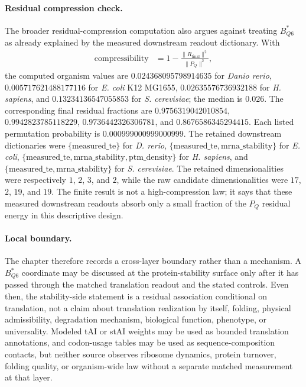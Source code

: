 \paragraph{Residual compression check.}
The broader residual-compression computation also argues against treating $B^{\ast}_{Q6}$ as already explained by the measured downstream readout dictionary. With
$$
\begin{aligned}
\mathrm{compressibility} &= 1-\frac{\lVert R_{\mathrm{final}}\rVert^2}{\lVert P_Q\rVert^2},
\end{aligned}
$$
the computed organism values are $0.024368095798914635$ for \emph{Danio rerio}, $0.005717621488177116$ for \emph{E. coli} K12 MG1655, $0.02635576736932188$ for \emph{H. sapiens}, and $0.13234136547055853$ for \emph{S. cerevisiae}; the median is $0.026$. The corresponding final residual fractions are $0.9756319042010854$, $0.9942823785118229$, $0.9736442326306781$, and $0.8676586345294415$. Each listed permutation probability is $0.000999000999000999$. The retained downstream dictionaries were $\{\mathrm{measured\_te}\}$ for \emph{D. rerio}, $\{\mathrm{measured\_te},\mathrm{mrna\_stability}\}$ for \emph{E. coli}, $\{\mathrm{measured\_te},\mathrm{mrna\_stability},\mathrm{ptm\_density}\}$ for \emph{H. sapiens}, and $\{\mathrm{measured\_te},\mathrm{mrna\_stability}\}$ for \emph{S. cerevisiae}. The retained dimensionalities were respectively $1$, $2$, $3$, and $2$, while the raw candidate dimensionalities were $17$, $2$, $19$, and $19$. The finite result is not a high-compression law; it says that these measured downstream readouts absorb only a small fraction of the $P_Q$ residual energy in this descriptive design.

\paragraph{Local boundary.}
The chapter therefore records a cross-layer boundary rather than a mechanism. A $B^{\ast}_{Q6}$ coordinate may be discussed at the protein-stability surface only after it has passed through the matched translation readout and the stated controls. Even then, the stability-side statement is a residual association conditional on translation, not a claim about translation realization by itself, folding, physical admissibility, degradation mechanism, biological function, phenotype, or universality. Modeled tAI or stAI weights may be used as bounded translation annotations, and codon-usage tables may be used as sequence-composition contacts, but neither source observes ribosome dynamics, protein turnover, folding quality, or organism-wide law without a separate matched measurement at that layer.

